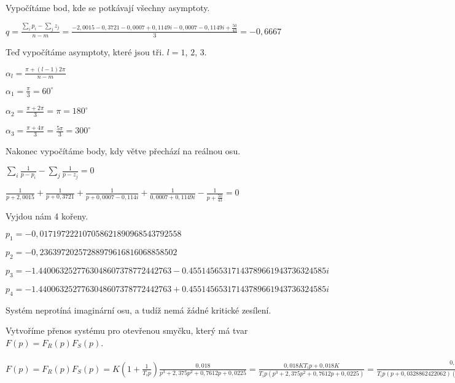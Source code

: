 \documentclass{article}
\begin{document}
			\begin{center}
			Vypočítáme bod, kde se potkávají všechny asymptoty.

			\bigskip

			$q=\frac{\sum_i p_i - \sum_j z_j}{n-m}=\frac{-2,0015-0,3721-0,0007+0,1149i-0,0007-0,1149i+\frac{50}{43}}{3}=- 0,6667$

			\bigskip

			Teď vypočítáme asymptoty, které jsou tři. $l=1$, $2$, $3$.

			\bigskip

			$\alpha_l=\frac{\pi+(l-1)2\pi}{n-m}$

			$\alpha_1=\frac{\pi}{3}=60^{\circ}$

			$\alpha_2=\frac{\pi+2\pi}{3}=\pi=180^{\circ}$

			$\alpha_3=\frac{\pi+4\pi}{3}=\frac{5\pi}{3}=300^{\circ}$

			\bigskip

			Nakonec vypočítáme body, kdy větve přechází na reálnou osu.

			\bigskip

			$\sum_i \frac{1}{p-p_i}-\sum_j \frac{1}{p-z_j}=0$

			$\frac{1}{p+2,0015}+\frac{1}{p+0,3721}+\frac{1}{p+0,0007-0,114i}+\frac{1}{0,0007+0,1149i}-\frac{1}{p+\frac{50}{43}}=0$

			\bigskip

			Vyjdou nám 4 kořeny.

			\bigskip

			$p_1=-0,017197222107058621890968543792558$

			$p_2=-0,23639720257288979616816068858502$

			$p_3=- 1.4400632527763048607378772442763 - 0.45514565317143789661943736324585i$

			$p_4=- 1.4400632527763048607378772442763 + 0.45514565317143789661943736324585i$

			\bigskip


			\end{center}

			\bigskip

Systém neprotíná imaginární osu, a tudíž nemá žádné kritické zesílení.

			Vytvoříme přenos systému pro otevřenou smyčku, který má tvar $F(p)=F_R(p)F_S(p)$.
			\begin{center}
			$F(p)=F_R(p)F_S(p)=K(1+\frac{1}{T_ip})\frac{0,018}{p^3 + 2,375 p^2 + 0,7612 p + 0,0225}=\frac{0,018KT_ip+0,018K}{T_ip(p^3 + 2,375 p^2 + 0,7612 p + 0,0225)}=\frac{0,018KT_i(p+\frac{1}{T_i})}{T_ip(p+0,0328862422062)(p+2,00003066251)(p+0,342083095279)}$
			\end{center}
\end{document}

